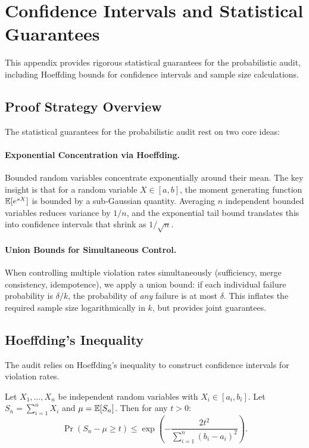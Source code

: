 \section{Confidence Intervals and Statistical Guarantees}
\label{app:confidence}

This appendix provides rigorous statistical guarantees for the probabilistic audit, including Hoeffding bounds for confidence intervals and sample size calculations.

\subsection{Proof Strategy Overview}

The statistical guarantees for the probabilistic audit rest on two core ideas:

\paragraph{Exponential Concentration via Hoeffding.}
Bounded random variables concentrate exponentially around their mean. The key insight is that for a random variable $X \in [a, b]$, the moment generating function $\mathbb{E}[e^{sX}]$ is bounded by a sub-Gaussian quantity. Averaging $n$ independent bounded variables reduces variance by $1/n$, and the exponential tail bound translates this into confidence intervals that shrink as $1/\sqrt{n}$.

\paragraph{Union Bounds for Simultaneous Control.}
When controlling multiple violation rates simultaneously (sufficiency, merge consistency, idempotence), we apply a union bound: if each individual failure probability is $\delta/k$, the probability of \emph{any} failure is at most $\delta$. This inflates the required sample size logarithmically in $k$, but provides joint guarantees.

\subsection{Hoeffding's Inequality}

The audit relies on Hoeffding's inequality to construct confidence intervals for violation rates.

\begin{theorem}
Let $X_1, \ldots, X_n$ be independent random variables with $X_i \in [a_i, b_i]$. Let $S_n = \sum_{i=1}^n X_i$ and $\mu = \mathbb{E}[S_n]$. Then for any $t > 0$:
\[
\Pr(S_n - \mu \ge t) \le \exp\left( -\frac{2t^2}{\sum_{i=1}^n (b_i - a_i)^2} \right).
\]
\end{theorem}

